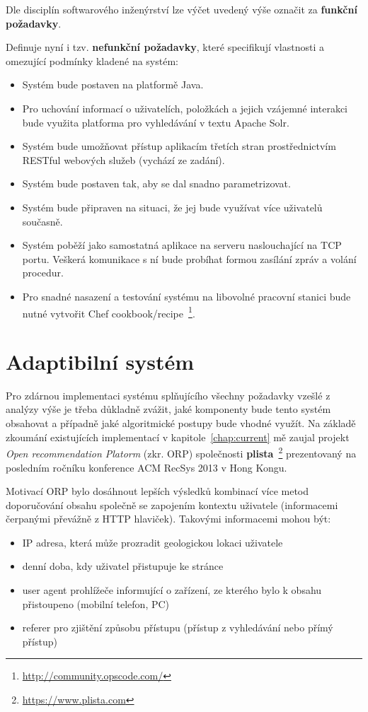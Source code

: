 \documentclass[thesis=M,czech]{FITthesis}[2014/05/07]
\begin{document}
Dle disciplín softwarového inženýrství lze výčet uvedený výše označit za \textbf{funkční požadavky}.

Definuje nyní i tzv. \textbf{nefunkční požadavky}, které specifikují vlastnosti a omezující podmínky kladené na systém:

\begin{itemize}
	\item Systém bude postaven na platformě Java.
	\item Pro uchování informací o uživatelích, položkách a jejich vzájemné interakci bude využita platforma pro vyhledávání v textu Apache Solr.
	\item Systém bude umožňovat přístup aplikacím třetích stran prostřednictvím RESTful webových služeb (vychází ze zadání).
	\item Systém bude postaven tak, aby se dal snadno parametrizovat. 
	\item Systém bude připraven na situaci, že jej bude využívat více uživatelů současně.
	\item Systém poběží jako samostatná aplikace na serveru naslouchající na TCP portu. Veškerá komunikace s ní bude probíhat formou zasílání zpráv a volání procedur.
	\item Pro snadné nasazení a testování systému na libovolné pracovní stanici bude nutné vytvořit Chef cookbook/recipe~\footnote{\url{http://community.opscode.com/}}.
\end{itemize}

\section{Adaptibilní systém}

Pro zdárnou implementaci systému splňujícího všechny požadavky vzešlé z analýzy výše je třeba důkladně zvážit, jaké komponenty bude tento systém obsahovat a případně jaké algoritmické postupy bude vhodné využít. Na základě zkoumání existujících implementací v kapitole~\ref{chap:current} mě zaujal projekt \emph{Open recommendation Platorm} (zkr. ORP) společnosti \textbf{plista}~\footnote{\url{https://www.plista.com}} prezentovaný na posledním ročníku konference ACM RecSys 2013 v Hong Kongu. 

Motivací ORP bylo dosáhnout lepších výsledků kombinací více metod doporučování obsahu společně se zapojením kontextu uživatele (informacemi čerpanými převážně z HTTP hlaviček). Takovými informacemi mohou být:

\begin{itemize}
	\item IP adresa, která může prozradit geologickou lokaci uživatele
	\item denní doba, kdy uživatel přistupuje ke stránce
	\item user agent prohlížeče informující o zařízení, ze kterého bylo k obsahu přistoupeno (mobilní telefon, PC)
	\item referer pro zjištění způsobu přístupu (přístup z vyhledávání nebo přímý přístup) 
\end{itemize}
\end{document}
